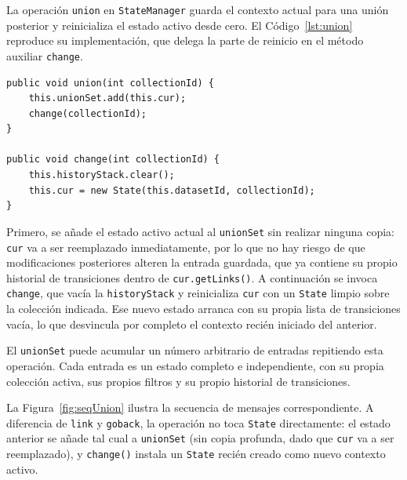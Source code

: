 La operación \texttt{union} en \texttt{StateManager} guarda el contexto actual para una
unión posterior y reinicializa el estado activo desde cero. El Código~\ref{lst:union}
reproduce su implementación, que delega la parte de reinicio en el método auxiliar
\texttt{change}.

\begin{lstlisting}[style=javaStyle, caption=Operación \texttt{union}, label=lst:union]
public void union(int collectionId) {
    this.unionSet.add(this.cur);
    change(collectionId);
}

public void change(int collectionId) {
    this.historyStack.clear();
    this.cur = new State(this.datasetId, collectionId);
}
\end{lstlisting}

Primero, se añade el estado activo actual al \texttt{unionSet} sin realizar ninguna
copia: \texttt{cur} va a ser reemplazado inmediatamente, por lo que no hay riesgo de
que modificaciones posteriores alteren la entrada guardada, que ya contiene su propio
historial de transiciones dentro de \texttt{cur.getLinks()}. A continuación se invoca
\texttt{change}, que vacía la \texttt{historyStack} y reinicializa \texttt{cur} con un
\texttt{State} limpio sobre la colección indicada. Ese nuevo estado arranca con su
propia lista de transiciones vacía, lo que desvincula por completo el contexto recién
iniciado del anterior.

El \texttt{unionSet} puede acumular un número arbitrario de entradas repitiendo esta
operación. Cada entrada es un estado completo e independiente, con su propia colección
activa, sus propios filtros y su propio historial de transiciones.

La Figura~\ref{fig:seqUnion} ilustra la secuencia de mensajes
correspondiente. A diferencia de \texttt{link} y \texttt{goback}, la
operación no toca \texttt{State} directamente: el estado anterior se
añade tal cual a \texttt{unionSet} (sin copia profunda, dado que
\texttt{cur} va a ser reemplazado), y \texttt{change()} instala un
\texttt{State} recién creado como nuevo contexto activo.

